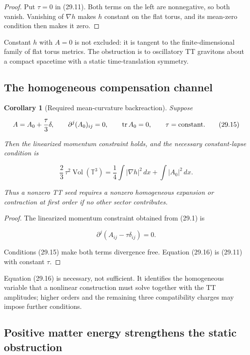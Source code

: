 \documentclass[11pt]{article}
\newtheorem{corollary}[theorem]{Corollary}
\theoremstyle{remark}
\begin{document}
\begin{proof}
Put \(\tau=0\) in (29.11).  Both terms on the left are nonnegative, so
both vanish.  Vanishing of \(\nabla h\) makes \(h\) constant on the flat
torus, and its mean-zero condition then makes it zero.
\end{proof}

Constant \(h\) with \(A=0\) is not excluded: it is tangent to the
finite-dimensional family of flat torus metrics.  The obstruction is to
oscillatory TT gravitons about a compact spacetime with a static
time-translation symmetry.

\subsection{The homogeneous compensation channel}

\begin{corollary}[Required mean-curvature backreaction]
\label{cor:v19v26-backreaction}
Suppose

\[
 A=A_0+\frac{\tau}{3}\delta,\qquad
 \partial^j(A_0)_{ij}=0,\qquad
 \operatorname{tr}A_0=0,\qquad \tau=\hbox{constant}.          \tag{29.15}
\]

Then the linearized momentum constraint holds, and the necessary
constant-lapse condition is

\[
 \frac23\,\tau^2\operatorname{Vol}(\mathbb T^3)
 =\frac14\int|\nabla h|^2\,dx+\int|A_0|^2\,dx.                \tag{29.16}
\]

Thus a nonzero TT seed requires a nonzero homogeneous expansion or
contraction at first order if no other sector contributes.
\end{corollary}

\begin{proof}
The linearized momentum constraint obtained from (29.1) is

\[
 \partial^j(A_{ij}-\tau\delta_{ij})=0.                        \tag{29.17}
\]

Conditions (29.15) make both terms divergence free.  Equation (29.16) is
(29.11) with constant \(\tau\).
\end{proof}

Equation (29.16) is necessary, not sufficient.  It identifies the
homogeneous variable that a nonlinear construction must solve together
with the TT amplitudes; higher orders and the remaining three
compatibility charges may impose further conditions.

\subsection{Positive matter energy strengthens the static obstruction}
\end{document}

